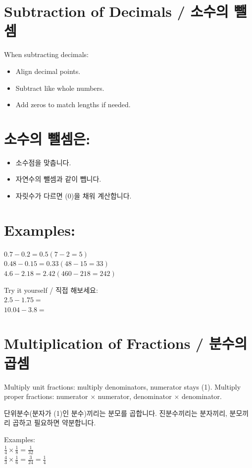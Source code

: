 \documentclass[10pt]{article}
\begin{document}
\section*{Subtraction of Decimals / 소수의 뺄셈}
When subtracting decimals:

\begin{itemize}
  \item Align decimal points.
  \item Subtract like whole numbers.
  \item Add zeros to match lengths if needed.
\end{itemize}

\section*{소수의 뺄셈은:}
\begin{itemize}
  \item 소수점을 맞춥니다.
  \item 자연수의 뺄셈과 같이 뺍니다.
  \item 자릿수가 다르면 (0)을 채워 계산합니다.
\end{itemize}

\section*{Examples:}
$0.7-0.2=0.5(7-2=5)$\\
$0.48-0.15=0.33(48-15=33)$\\
$4.6-2.18=2.42(460-218=242)$

Try it yourself / 직접 해보세요:\\
$2.5-1.75=$\\
$10.04-3.8=$

\section*{Multiplication of Fractions / 분수의 곱셈}
Multiply unit fractions: multiply denominators, numerator stays (1). Multiply proper fractions: numerator $\times$ numerator, denominator $\times$ denominator.

단위분수(분자가 (1)인 분수)끼리는 분모를 곱합니다. 진분수끼리는 분자끼리, 분모끼리 곱하고 필요하면 약분합니다.

Examples:\\
$\frac{1}{4} \times \frac{1}{8}=\frac{1}{32}$\\
$\frac{4}{3} \times \frac{1}{6}=\frac{3}{24}=\frac{1}{4}$
\end{document}
